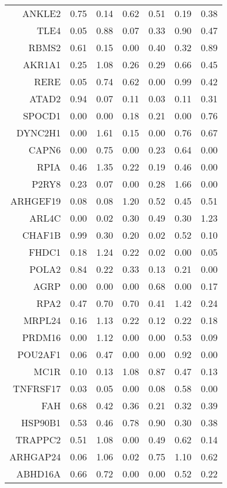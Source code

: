 \begin{longtable}{rrrrrrr}
  ANKLE2 & 0.75 & 0.14 & 0.62 & 0.51 & 0.19 & 0.38 \\ 
  TLE4 & 0.05 & 0.88 & 0.07 & 0.33 & 0.90 & 0.47 \\ 
  RBMS2 & 0.61 & 0.15 & 0.00 & 0.40 & 0.32 & 0.89 \\ 
  AKR1A1 & 0.25 & 1.08 & 0.26 & 0.29 & 0.66 & 0.45 \\ 
  RERE & 0.05 & 0.74 & 0.62 & 0.00 & 0.99 & 0.42 \\ 
  ATAD2 & 0.94 & 0.07 & 0.11 & 0.03 & 0.11 & 0.31 \\ 
  SPOCD1 & 0.00 & 0.00 & 0.18 & 0.21 & 0.00 & 0.76 \\ 
  DYNC2H1 & 0.00 & 1.61 & 0.15 & 0.00 & 0.76 & 0.67 \\ 
  CAPN6 & 0.00 & 0.75 & 0.00 & 0.23 & 0.64 & 0.00 \\ 
  RPIA & 0.46 & 1.35 & 0.22 & 0.19 & 0.46 & 0.00 \\ 
  P2RY8 & 0.23 & 0.07 & 0.00 & 0.28 & 1.66 & 0.00 \\ 
  ARHGEF19 & 0.08 & 0.08 & 1.20 & 0.52 & 0.45 & 0.51 \\ 
  ARL4C & 0.00 & 0.02 & 0.30 & 0.49 & 0.30 & 1.23 \\ 
  CHAF1B & 0.99 & 0.30 & 0.20 & 0.02 & 0.52 & 0.10 \\ 
  FHDC1 & 0.18 & 1.24 & 0.22 & 0.02 & 0.00 & 0.05 \\ 
  POLA2 & 0.84 & 0.22 & 0.33 & 0.13 & 0.21 & 0.00 \\ 
  AGRP & 0.00 & 0.00 & 0.00 & 0.68 & 0.00 & 0.17 \\ 
  RPA2 & 0.47 & 0.70 & 0.70 & 0.41 & 1.42 & 0.24 \\ 
  MRPL24 & 0.16 & 1.13 & 0.22 & 0.12 & 0.22 & 0.18 \\ 
  PRDM16 & 0.00 & 1.12 & 0.00 & 0.00 & 0.53 & 0.09 \\ 
  POU2AF1 & 0.06 & 0.47 & 0.00 & 0.00 & 0.92 & 0.00 \\ 
  MC1R & 0.10 & 0.13 & 1.08 & 0.87 & 0.47 & 0.13 \\ 
  TNFRSF17 & 0.03 & 0.05 & 0.00 & 0.08 & 0.58 & 0.00 \\ 
  FAH & 0.68 & 0.42 & 0.36 & 0.21 & 0.32 & 0.39 \\ 
  HSP90B1 & 0.53 & 0.46 & 0.78 & 0.90 & 0.30 & 0.38 \\ 
  TRAPPC2 & 0.51 & 1.08 & 0.00 & 0.49 & 0.62 & 0.14 \\ 
  ARHGAP24 & 0.06 & 1.06 & 0.02 & 0.75 & 1.10 & 0.62 \\ 
  ABHD16A & 0.66 & 0.72 & 0.00 & 0.00 & 0.52 & 0.22 \\ 

\end{longtable}
